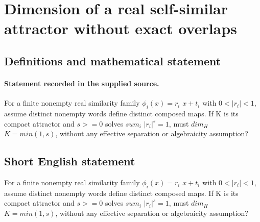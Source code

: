 \documentclass[11pt]{article}
\begin{document}
\section*{Dimension of a real self-similar attractor without exact overlaps}\label{statement}
\subsection{Definitions and mathematical statement}
\paragraph{Statement recorded in the supplied source.}
For a finite nonempty real similarity family $\phi _i(x)=r_i$ $x+t_i$ with $0<|r_i|<1$, assume distinct nonempty words define distinct composed maps. If K is its compact attractor and $s>=0$ solves $sum_i$ $|r_i|^s=1$, must $dim_H$ $K=min(1,s)$, without any effective separation or algebraicity assumption?
\subsection{Short English statement}
For a finite nonempty real similarity family $\phi _i(x)=r_i$ $x+t_i$ with $0<|r_i|<1$, assume distinct nonempty words define distinct composed maps. If K is its compact attractor and $s>=0$ solves $sum_i$ $|r_i|^s=1$, must $dim_H$ $K=min(1,s)$, without any effective separation or algebraicity assumption?
\end{document}
